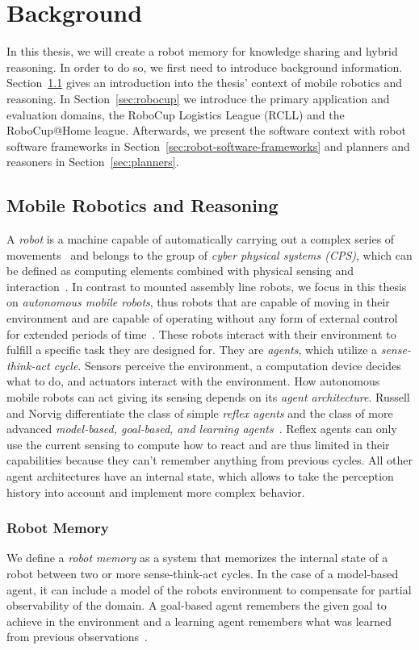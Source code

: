 \chapter{Background}
\label{chap:background}
In this thesis, we will create a robot memory for knowledge sharing and
hybrid reasoning. In order to do so, we first need to introduce
background information. Section~\ref{sec:mobile-robotics} gives an
introduction into the thesis' context of mobile robotics and
reasoning. In Section~\ref{sec:robocup} we introduce the primary
application and evaluation domains, the RoboCup Logistics League
(RCLL) and the RoboCup@Home league. Afterwards, we present the
software context with robot software frameworks in
Section~\ref{sec:robot-software-frameworks} and planners and reasoners in
Section~\ref{sec:planners}.

\section{Mobile Robotics and Reasoning}
\label{sec:mobile-robotics}
A \emph{robot} is a machine capable of automatically carrying out a
  complex series of movements~\cite{robot-dict} and belongs to the
group of \emph{cyber physical systems (CPS)}, which can be defined
as computing elements combined with physical sensing and
  interaction~\cite{chapter-cps}. In contrast to mounted assembly
line robots, we focus in this thesis on \emph{autonomous mobile robots}, thus
robots that are capable of moving in their environment and
are capable of operating without any form of external control
  for extended periods of time~\cite{autonomous-robots}. These robots
interact with their environment to fulfill a specific task they are
designed for. They are \emph{agents}, which utilize a
\emph{sense-think-act cycle}. Sensors perceive the
environment, a computation device decides what to do, and actuators
interact with the environment. How autonomous mobile robots can
act giving its sensing depends on its \emph{agent
  architecture}. Russell and Norvig differentiate the class of simple
\emph{reflex agents} and the class of more advanced
\emph{model-based, goal-based, and learning
  agents}~\cite{aimodern}. Reflex agents can only use the current
sensing to compute how to react and are thus limited in their
capabilities because they can't remember anything from previous
cycles. All other agent architectures have an internal state, which
allows to take the perception history into account and implement more
complex behavior.

\subsection{Robot Memory}
\label{sec:robot-memories}
We define a \emph{robot memory} as a system that memorizes the
internal state of a robot between two or more sense-think-act
cycles. In the case of a model-based agent, it can include a model of
the robots environment to compensate for partial observability of the
domain. A goal-based agent remembers the given goal to achieve in the
environment and a learning agent remembers what was learned from
previous observations~\cite{aimodern}.


